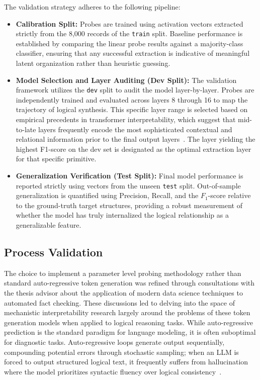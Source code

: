\documentclass[12 pt]{article}  %
\begin{document}
The validation strategy adheres to the following pipeline:

\begin{itemize}
    \item \textbf{Calibration Split:} Probes are trained using activation 
    vectors extracted strictly from the 8,000 records of the \texttt{train} split. 
    Baseline performance is established by comparing the linear probe results 
    against a majority-class classifier, ensuring that any successful extraction 
    is indicative of meaningful latent organization rather than heuristic 
    guessing.
    \item \textbf{Model Selection and Layer Auditing (Dev Split):} The 
    validation framework utilizes the \texttt{dev} split to audit the model 
    layer-by-layer. Probes are independently trained and evaluated across layers 
    8 through 16 to map the trajectory of logical synthesis. This specific layer 
    range is selected based on empirical precedents in transformer 
    interpretability, which suggest that mid-to-late layers frequently encode 
    the most sophisticated contextual and relational information prior to the 
    final output layers~\cite{marks2024geometrytruthemergentlinear}. The layer 
    yielding the highest F1-score on the dev set is designated as the optimal 
    extraction layer for that specific primitive.
    \item \textbf{Generalization Verification (Test Split):} Final model 
    performance is reported strictly using vectors from the unseen \texttt{test} 
    split. Out-of-sample generalization is quantified using Precision, Recall, 
    and the $F_1$-score relative to the ground-truth target structures, 
    providing a robust measurement of whether the model has truly internalized 
    the logical relationship as a generalizable feature.
\end{itemize}

\subsection{Process Validation}
The choice to implement a parameter level probing methodology rather than 
standard auto-regressive token generation was refined through consultations with 
the thesis advisor about the application of modern data science techniques to 
automated fact checking. These discussions led to delving into the space of 
mechanistic interpretability research largely around the problems of these token 
generation models when applied to logical reasoning tasks. While auto-regressive 
prediction is the standard paradigm for language modeling, it is often 
suboptimal for diagnostic tasks. Auto-regressive loops generate output 
sequentially, compounding potential errors through stochastic sampling; when an 
LLM is forced to output structured logical text, it frequently suffers from 
hallucination where the model prioritizes syntactic fluency over logical 
consistency~\cite{cheng2025empoweringllmslogicalreasoning}.
\end{document}
